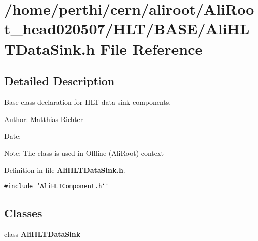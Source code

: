 \section{/home/perthi/cern/aliroot/Ali\-Root\_\-head020507/HLT/BASE/Ali\-HLTData\-Sink.h File Reference}
\label{AliHLTDataSink_8h}


\subsection{Detailed Description}
Base class declaration for HLT data sink components. 

\begin{Desc}
\item[Author:]Matthias Richter \end{Desc}
\begin{Desc}
\item[Date:]\end{Desc}
\begin{Desc}
\item[Note:]The class is used in Offline (Ali\-Root) context\end{Desc}


Definition in file {\bf Ali\-HLTData\-Sink.h}.

{\tt \#include \char`\"{}Ali\-HLTComponent.h\char`\"{}}\par
\subsection*{Classes}
\begin{CompactItemize}
\item 
class {\bf Ali\-HLTData\-Sink}
\end{CompactItemize}
